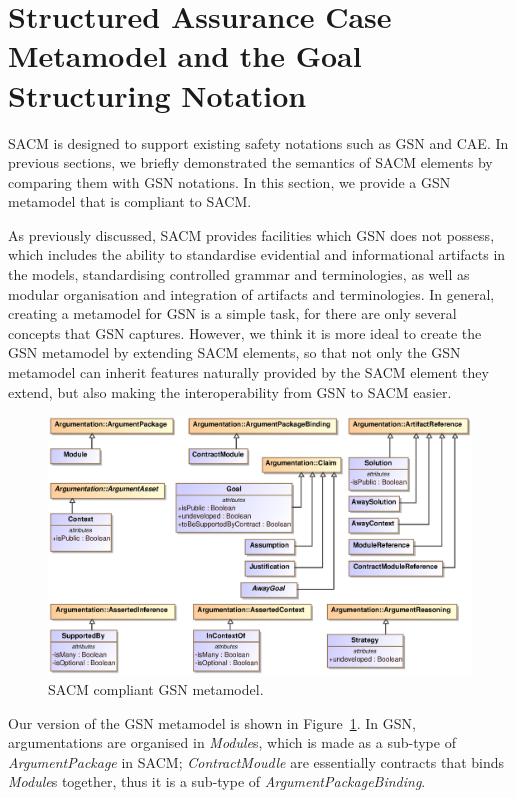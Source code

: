 \section{Structured Assurance Case Metamodel and the Goal Structuring Notation}
SACM is designed to support existing safety notations such as GSN and CAE. In previous sections, we briefly demonstrated the semantics of SACM elements by comparing them with GSN notations. In this section, we provide a GSN metamodel that is compliant to SACM. 

As previously discussed, SACM provides facilities which GSN does not possess, which includes the ability to standardise evidential and informational artifacts in the models, standardising controlled grammar and terminologies, as well as modular organisation and integration of artifacts and terminologies. In general, creating a metamodel for GSN is a simple task, for there are only several concepts that GSN captures. However, we think it is more ideal to create the GSN metamodel by extending SACM elements, so that not only the GSN metamodel can inherit features naturally provided by the SACM element they extend, but also making the interoperability from GSN to SACM easier. 
\begin{figure}
	\centering
	\includegraphics[width=1\linewidth]{GSN.eps}
	\caption{SACM compliant GSN metamodel.}
	\label{fig:gsnMetamodel}
\end{figure}

Our version of the GSN metamodel is shown in Figure~\ref{fig:gsnMetamodel}. In GSN, argumentations are organised in \textit{Module}s, which is made as a sub-type of \textit{ArgumentPackage} in SACM; \textit{ContractMoudle} are essentially contracts that binds \textit{Module}s together, thus it is a sub-type of \textit{ArgumentPackageBinding}. 

